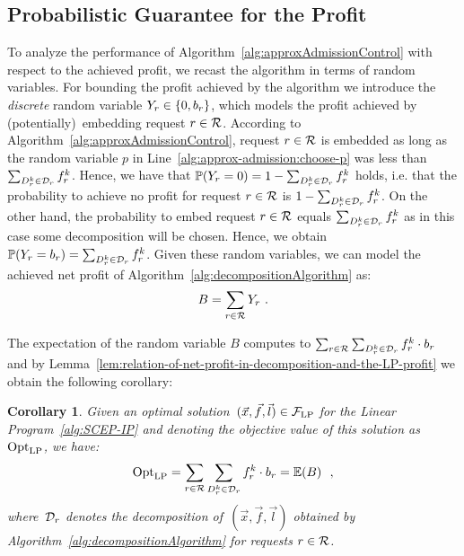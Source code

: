 \documentclass[10pt, conference, letterpaper]{IEEEtran}
\newtheorem{corollary}[theorem]{Corollary}
\begin{document}
\subsection{Probabilistic Guarantee for the Profit} 
\label{sec:performance-guarantee-obj-admission-control}

To analyze the performance of Algorithm~\ref{alg:approxAdmissionControl} with respect to the achieved profit, we recast the algorithm in terms of random variables. For bounding the profit achieved by the algorithm we introduce the \emph{discrete} random variable $\randVarY \in \{0,\Vprofit\}$, which models the profit achieved by (potentially)~embedding request $r \in \mathcal{R}$.
According to Algorithm~\ref{alg:approxAdmissionControl}, request $r \in \mathcal{R}$ is embedded as long as the random variable $p$ in Line~\ref{alg:approx-admission:choose-p} was less than $\sum_{\decomp \in \PotEmbeddings} \prob$. Hence, we have that $\ProbVarY[0] = 1 - \sum_{\decomp \in \PotEmbeddings} \prob$ holds, i.e. that the probability to achieve no profit for request $r \in \mathcal{R}$ is $1-\sum_{\decomp \in \PotEmbeddings} \prob$. On the other hand, the probability to embed request $r \in \mathcal{R}$ equals $\sum_{\decomp \in \PotEmbeddings} \prob$ as in this case some decomposition will be chosen. Hence, we obtain $\ProbVarY[\Vprofit] = \sum_{\decomp \in \PotEmbeddings} \prob$. Given these random variables, we can model the achieved net profit of Algorithm~\ref{alg:decompositionAlgorithm} as: 
\begin{align}
\label{eq:modeling-B-as-random-variables}
	B = \sum_{\req \in \requests} \randVarY ~.
\end{align}

The expectation of the random variable $B$ computes to $\sum_{\req \in \requests} \sum_{\decomp \in \PotEmbeddings} \prob \cdot \Vprofit$ and by Lemma~\ref{lem:relation-of-net-profit-in-decomposition-and-the-LP-profit} we obtain the following corollary:

\begin{corollary}
\label{cor:RelatingObjectiveLPAndExpectationOfRounding}
Given an \emph{optimal} solution~$(\vec{x}, \vec{f}, \vec{l}) \in  \mathcal{F}_{\textnormal{LP}}$ for the Linear Program~\ref{alg:SCEP-IP} and denoting the objective value of this solution as~$\textnormal{Opt}_{\textnormal{LP}}$, we have:
\[
	\optLP = \sum_{\req \in \requests}\sum_{\decomp \in \PotEmbeddings} \prob \cdot \Vprofit = \Exp(B)~~,
\]
where~$\PotEmbeddings$ denotes the decomposition of~$(\vec{x}, \vec{f}, \vec{l})$ obtained by Algorithm~\ref{alg:decompositionAlgorithm} for requests $r \in \mathcal{R}$.
\end{corollary}
\end{document}
